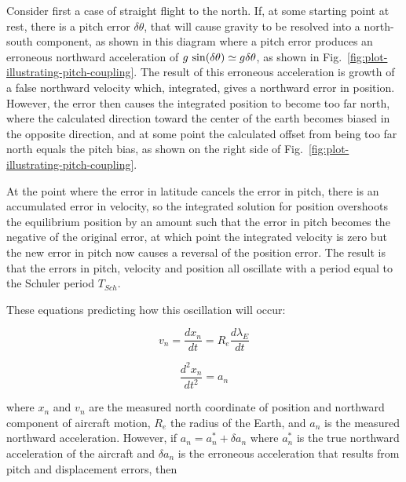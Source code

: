 \documentclass[12pt,twoside,english]{article}\usepackage[]{graphicx}\usepackage[]{color}
\begin{document}
Consider first a case of straight flight to the north. If, at some starting point at rest, there is a pitch error $\delta\theta$, that will cause gravity to be resolved into a north-south component, as shown in this diagram where a pitch error produces an erroneous northward acceleration of $g\thinspace\sin(\delta\theta)\simeq g\delta\theta$, as shown in Fig.~\ref{fig:plot-illustrating-pitch-coupling}.
The result of this erroneous acceleration is growth of a false northward velocity which, integrated, gives a northward error in position. However, the error then causes the integrated position to become too far north, where the calculated direction toward the center of the earth becomes biased in the opposite direction, and at some point the calculated offset from being too far north equals the pitch bias, as shown on the right side of Fig.~\ref{fig:plot-illustrating-pitch-coupling}.

At the point where the error in latitude cancels the error in pitch, there is an accumulated error in velocity, so the integrated solution for position overshoots the equilibrium position by an amount such that the error in pitch becomes the negative of the original error, at which point the integrated velocity is zero but the new error in pitch now causes a reversal of the position error. The result is that the errors in pitch, velocity and position all oscillate with a period equal to the Schuler period $T_{Sch}$. 

These equations predicting how this oscillation will occur: 

\begin{equation}
v_{n}=\frac{dx_{n}}{dt}=R_{e}\frac{d\lambda_E}{dt}\label{eq:vn} 
\end{equation}


\begin{equation}
\frac{d^{2}x_{n}}{dt^{2}}=a_{n}\label{eq:an}
\end{equation}


where $x_{n}$ and $v_n$ are the measured north coordinate of position and
northward component of aircraft motion, $R_e$ the radius of the Earth, and $a_{n}$ is the measured northward acceleration. However, if $a_{n}=a_{n}^{*}+\delta a_{n}$ where $a_{n}^{*}$ is the true northward acceleration of the aircraft and $\delta a_{n}$ is the erroneous acceleration that results from pitch and displacement errors, then 
\end{document}
